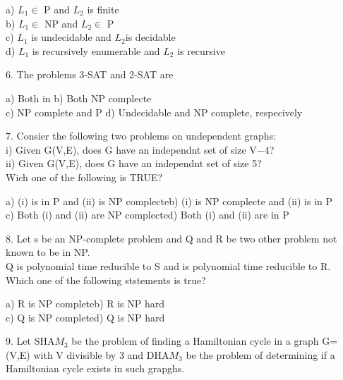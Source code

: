 \documentclass[a4paper]{article}
\begin{document}
a)  $L_1$$\in$ P and $L_2$ is finite\\
b)  $L_1$$\in$ NP and $L_2$$\in$ P\\
c)  $L_1$ is undecidable and $L_2$is decidable\\
d)  $L_1$ is recursively enumerable and $L_2$ is recursive\\
\begin{flushleft}
6. The problems 3-SAT and 2-SAT are\\
\end{flushleft}
a)  Both in\hspace{3cm} b)  Both NP complecte\\
c)  NP complete and P\hspace{1.2cm} d)  Undecidable and NP complete, respecively\\
\begin{flushleft}
7. Consier the following two problems on undependent graphs:\\
i)  Given G(V,E), does G have an independnt set of size V$-$4?\\
ii) Given G(V,E), does G have an independnt set of size 5?\\
Wich one of the following is TRUE?\\ 
\end{flushleft}
a) (i) is in P and (ii) is NP complecte\hspace{7mm}b) (i) is NP complecte and (ii) is in P\\
c) Both (i) and (ii) are NP complecte\hspace{7mm}d)  Both (i) and (ii) are in P\\
\begin{flushleft}
8. Let s be an NP-complete problem and Q and R be two other problem not known to be in NP.\\
Q is polynomial time reducible to S and is polynomial time reducible to R. Which one of the following ststements is true?\\
\end{flushleft}
a) R is NP complete\hspace{4cm}b) R is NP hard\\
c) Q is NP complete\hspace{4cm}d) Q is NP hard\\
\begin{flushleft}
9. Let SHA$M_3$ be  the problem of finding a Hamiltonian cycle in a graph G=(V,E) with V divisible by 3 and DHA$M_3$ be the problem of determining if a Hamiltonian cycle exists in such grapghs.\\

\end{flushleft}$$
\end{document}
